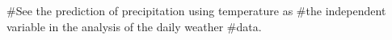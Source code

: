 \begin{SeeAlso}\relax
{}
\end{SeeAlso}
\begin{Examples}
\begin{ExampleCode}
#See the prediction of precipitation using temperature as
#the independent variable in the analysis of the daily weather
#data.
\end{ExampleCode}
\end{Examples}

